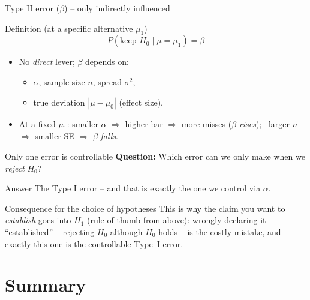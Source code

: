 \documentclass[aspectratio=169,11pt]{beamer}
\begin{document}
\begin{frame}{Type II error ($\beta$) -- only indirectly influenced}
  \begin{block}{Definition (at a specific alternative $\mu_1$)}
    \[
      P(\text{keep } H_0 \mid \mu = \mu_1) = \beta
    \]
  \end{block}
  \begin{itemize}\setlength{\itemsep}{2pt}
    \item No \emph{direct} lever; $\beta$ depends on:
          \begin{itemize}\footnotesize
            \item $\alpha$, sample size $n$, spread $\sigma^2$,
            \item true deviation $|\mu-\mu_0|$ (effect size).
          \end{itemize}
    \item At a fixed $\mu_1$: smaller $\alpha$ $\Rightarrow$ higher bar
          $\Rightarrow$ more misses ($\beta$ \emph{rises}); \ larger $n$
          $\Rightarrow$ smaller SE $\Rightarrow$ $\beta$ \emph{falls}.
  \end{itemize}
\end{frame}

\begin{frame}{Only one error is controllable}
  \textbf{Question:} Which error can we only make when we \emph{reject} $H_0$?
  \begin{block}{Answer}
    The Type I error -- and that is exactly the one we control via $\alpha$.
  \end{block}
  \begin{alertblock}{Consequence for the choice of hypotheses}
    This is why the claim you want to \emph{establish} goes into $H_1$ (rule of
    thumb from above): wrongly declaring it ``established'' -- rejecting $H_0$
    although $H_0$ holds -- is the costly mistake, and exactly this one is the
    controllable Type~I error.
  \end{alertblock}
\end{frame}

\section[Summary]{Summary}
\end{document}
